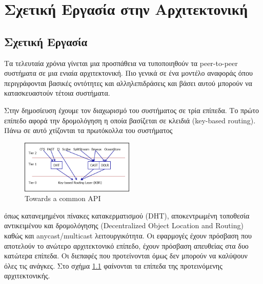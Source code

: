 \chapter{Σχετική Εργασία στην Αρχιτεκτονική} 
\label{chap:Literature}

\section{Σχετική Εργασία}

Τα τελευταία χρόνια γίνεται μια προσπάθεια να τυποποιηθούν τα 
peer-to-peer συστήματα σε μια ενιαία αρχιτεκτονική. Πιο γενικά σε ένα 
μοντέλο αναφοράς όπου περιγράφονται βασικές οντότητες και 
αλληλεπιδράσεις και βάσει αυτού μπορούν να κατασκευαστούν τέτοια 
συστήματα.

Στην δημοσίευση \citep{F.Dabek2003} έχουμε τον διαχωρισμό του συστήματος 
σε τρία επίπεδα. Το πρώτο επίπεδο αφορά την δρομολόγηση η οποία βασίζεται σε κλειδιά 
(key-based routing). Πάνω σε αυτό χτίζονται τα πρωτόκολλα του συστήματος 
\begin{figure}
  \begin{center}
    \includegraphics[width=0.48\textwidth]{Figures/Related_work/Towards_a_common_API_(tiers).png}
  \end{center}
  \caption{Towards a common API}
  \label{fig:Α_common_API}
\end{figure}
όπως κατανεμημένοι πίνακες κατακερματισμού (DHT), αποκεντρωμένη 
τοποθεσία αντικειμένου και δρομολόγησης (Decentralized Object Location 
and Routing) καθώς και anycast/multicast λειτουργικότητα. Οι εφαρμογές 
έχουν πρόσβαση που αποτελούν το ανώτερο αρχιτεκτονικό επίπεδο, έχουν 
πρόσβαση απευθείας στα δυο κατώτερα επίπεδα. Οι διεπαφές που 
προτείνονται όμως δεν μπορούν να καλύψουν όλες τις ανάγκες. Στο σχήμα  
\ref{fig:Α_common_API} φαίνονται τα επίπεδα της προτεινόμενης αρχιτεκτονικής.

